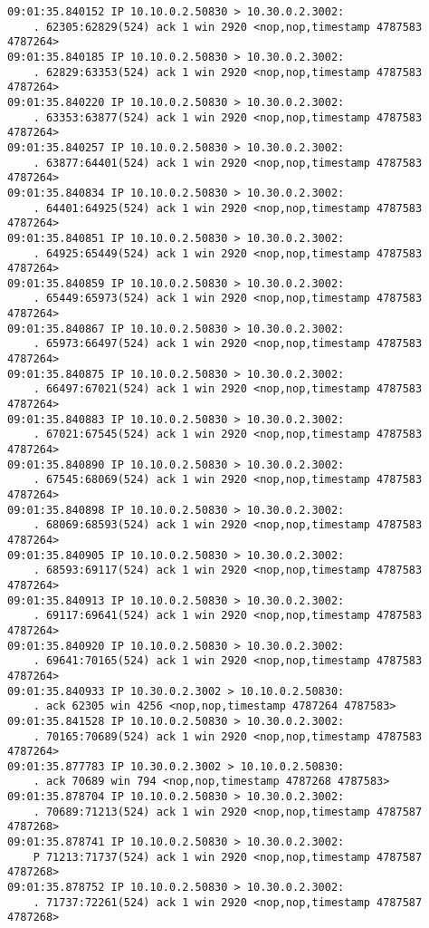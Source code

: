 \documentclass[a4paper,12pt]{article}
\begin{document}
\begin{Verbatim}
09:01:35.840152 IP 10.10.0.2.50830 > 10.30.0.2.3002: 
    . 62305:62829(524) ack 1 win 2920 <nop,nop,timestamp 4787583 4787264>
09:01:35.840185 IP 10.10.0.2.50830 > 10.30.0.2.3002: 
    . 62829:63353(524) ack 1 win 2920 <nop,nop,timestamp 4787583 4787264>
09:01:35.840220 IP 10.10.0.2.50830 > 10.30.0.2.3002: 
    . 63353:63877(524) ack 1 win 2920 <nop,nop,timestamp 4787583 4787264>
09:01:35.840257 IP 10.10.0.2.50830 > 10.30.0.2.3002: 
    . 63877:64401(524) ack 1 win 2920 <nop,nop,timestamp 4787583 4787264>
09:01:35.840834 IP 10.10.0.2.50830 > 10.30.0.2.3002: 
    . 64401:64925(524) ack 1 win 2920 <nop,nop,timestamp 4787583 4787264>
09:01:35.840851 IP 10.10.0.2.50830 > 10.30.0.2.3002: 
    . 64925:65449(524) ack 1 win 2920 <nop,nop,timestamp 4787583 4787264>
09:01:35.840859 IP 10.10.0.2.50830 > 10.30.0.2.3002: 
    . 65449:65973(524) ack 1 win 2920 <nop,nop,timestamp 4787583 4787264>
09:01:35.840867 IP 10.10.0.2.50830 > 10.30.0.2.3002: 
    . 65973:66497(524) ack 1 win 2920 <nop,nop,timestamp 4787583 4787264>
09:01:35.840875 IP 10.10.0.2.50830 > 10.30.0.2.3002: 
    . 66497:67021(524) ack 1 win 2920 <nop,nop,timestamp 4787583 4787264>
09:01:35.840883 IP 10.10.0.2.50830 > 10.30.0.2.3002: 
    . 67021:67545(524) ack 1 win 2920 <nop,nop,timestamp 4787583 4787264>
09:01:35.840890 IP 10.10.0.2.50830 > 10.30.0.2.3002: 
    . 67545:68069(524) ack 1 win 2920 <nop,nop,timestamp 4787583 4787264>
09:01:35.840898 IP 10.10.0.2.50830 > 10.30.0.2.3002: 
    . 68069:68593(524) ack 1 win 2920 <nop,nop,timestamp 4787583 4787264>
09:01:35.840905 IP 10.10.0.2.50830 > 10.30.0.2.3002: 
    . 68593:69117(524) ack 1 win 2920 <nop,nop,timestamp 4787583 4787264>
09:01:35.840913 IP 10.10.0.2.50830 > 10.30.0.2.3002: 
    . 69117:69641(524) ack 1 win 2920 <nop,nop,timestamp 4787583 4787264>
09:01:35.840920 IP 10.10.0.2.50830 > 10.30.0.2.3002: 
    . 69641:70165(524) ack 1 win 2920 <nop,nop,timestamp 4787583 4787264>
09:01:35.840933 IP 10.30.0.2.3002 > 10.10.0.2.50830: 
    . ack 62305 win 4256 <nop,nop,timestamp 4787264 4787583>
09:01:35.841528 IP 10.10.0.2.50830 > 10.30.0.2.3002: 
    . 70165:70689(524) ack 1 win 2920 <nop,nop,timestamp 4787583 4787264>
09:01:35.877783 IP 10.30.0.2.3002 > 10.10.0.2.50830: 
    . ack 70689 win 794 <nop,nop,timestamp 4787268 4787583>
09:01:35.878704 IP 10.10.0.2.50830 > 10.30.0.2.3002: 
    . 70689:71213(524) ack 1 win 2920 <nop,nop,timestamp 4787587 4787268>
09:01:35.878741 IP 10.10.0.2.50830 > 10.30.0.2.3002: 
    P 71213:71737(524) ack 1 win 2920 <nop,nop,timestamp 4787587 4787268>
09:01:35.878752 IP 10.10.0.2.50830 > 10.30.0.2.3002: 
    . 71737:72261(524) ack 1 win 2920 <nop,nop,timestamp 4787587 4787268>

\end{Verbatim}
\end{document}
